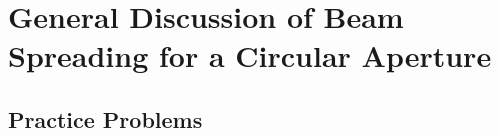 \documentclass[]{article}
\begin{document}
\section{General Discussion of Beam Spreading for a Circular Aperture}

\subsection{Practice Problems}
\end{document}
